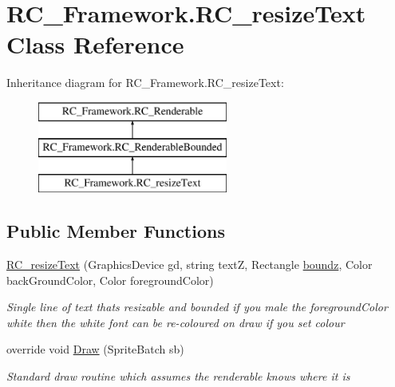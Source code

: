 \hypertarget{class_r_c___framework_1_1_r_c__resize_text}{}\section{R\+C\+\_\+\+Framework.\+R\+C\+\_\+resize\+Text Class Reference}
\label{class_r_c___framework_1_1_r_c__resize_text}
Inheritance diagram for R\+C\+\_\+\+Framework.\+R\+C\+\_\+resize\+Text\+:\begin{figure}[H]
\begin{center}
\leavevmode
\includegraphics[height=3.000000cm]{class_r_c___framework_1_1_r_c__resize_text}
\end{center}
\end{figure}
\subsection*{Public Member Functions}
\begin{DoxyCompactItemize}
\item 
\mbox{\hyperlink{class_r_c___framework_1_1_r_c__resize_text_a177f87e9f41967dae29a97e27b3defd2}{R\+C\+\_\+resize\+Text}} (Graphics\+Device gd, string textZ, Rectangle \mbox{\hyperlink{class_r_c___framework_1_1_r_c___renderable_bounded_aabcb0f8cd56a2e7b6209f8530194aff1}{boundz}}, Color back\+Ground\+Color, Color foreground\+Color)
\begin{DoxyCompactList}\small\item\em Single line of text thats resizable and bounded if you male the foreground\+Color white then the white font can be re-\/coloured on draw if you set colour \end{DoxyCompactList}\item 
override void \mbox{\hyperlink{class_r_c___framework_1_1_r_c__resize_text_aa591010e25943e1c1a45555cecaa8fcc}{Draw}} (Sprite\+Batch sb)
\begin{DoxyCompactList}\small\item\em Standard draw routine which assumes the renderable knows where it is \end{DoxyCompactList}\end{DoxyCompactItemize}

